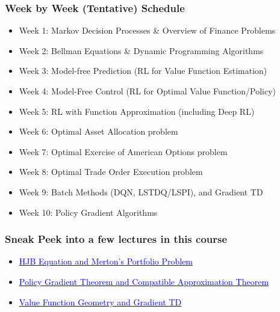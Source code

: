 \documentclass{beamer}
\begin{document}
\begin{frame}
\frametitle{Week by Week (Tentative) Schedule}
\begin{itemize}
\item Week 1: Markov Decision Processes \& Overview of Finance Problems
\item Week 2: Bellman Equations \& Dynamic Programming Algorithms
\item Week 3: Model-free Prediction (RL for Value Function Estimation)
\item Week 4: Model-Free Control (RL for Optimal Value Function/Policy)
\item Week 5: RL with Function Approximation (including Deep RL)
\item Week 6: Optimal Asset Allocation problem
\item Week 7: Optimal Exercise of American Options problem
\item Week 8: Optimal Trade Order Execution problem
\item Week 9: Batch Methods (DQN, LSTDQ/LSPI), and Gradient TD
\item Week 10: Policy Gradient Algorithms

\end{itemize}
\end{frame}

\begin{frame}
\frametitle{Sneak Peek into a few lectures in this course}
\begin{itemize}
\item \href{https://github.com/coverdrive/technical-documents/blob/master/finance/cme241/MertonPortfolio.pdf}{\underline{\textcolor{blue}{HJB Equation and Merton's Portfolio Problem}}}
\item \href{https://github.com/coverdrive/technical-documents/blob/master/finance/cme241/PolicyGradient.pdf}{\underline{\textcolor{blue}{Policy Gradient Theorem and Compatible Approximation Theorem}}}
\item \href{https://github.com/coverdrive/technical-documents/blob/master/finance/cme241/ValueFunctionGeometry.pdf}{\underline{\textcolor{blue}{Value Function Geometry and Gradient TD}}}
\end{itemize}
\end{frame}
\end{document}

